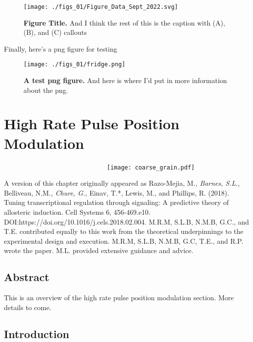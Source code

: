 \documentclass[12pt]{caltech_thesis}
\begin{document}
\hypertarget{fig:custom_figure}{%
\begin{figure}
\centering
\texttt{[image: ./figs\_01/Figure\_Data\_Sept\_2022.svg]}
\caption[{A jitterate data figure.}]{\textbf{Figure Title.} And I think
the rest of this is the caption with (A), (B), and (C) callouts}
\label{fig:custom_figure}
\end{figure}
}

Finally, here's a png figure for testing

\hypertarget{fig:test_png_figure}{%
\begin{figure}
\centering
\texttt{[image: ./figs\_01/fridge.png]}
\caption[{A png figure.}]{\textbf{A test png figure.} And here is where
I'd put in more information about the png.}
\label{fig:test_png_figure}
\end{figure}
}

\hypertarget{high-rate-pulse-position-modulation}{%
\chapter{High Rate Pulse Position
Modulation}\label{high-rate-pulse-position-modulation}}

~~~~~~~~~~~~~~~~~~~~~~~~~~~~~~\texttt{[image: coarse\_grain.pdf]}

A version of this chapter originally appeared as Razo-Mejia, M.\emph{,
Barnes, S.L.}, Belliveau, N.M.\emph{, Chure, G.}, Einav, T.*, Lewis, M.,
and Phillips, R. (2018). Tuning transcriptional regulation through
signaling: A predictive theory of allosteric induction. Cell Systems 6,
456-469.e10. DOI:https://doi.org/10.1016/j.cels.2018.02.004. M.R.M,
S.L.B, N.M.B, G.C., and T.E. contributed equally to this work from the
theoretical underpinnings to the experimental design and execution.
M.R.M, S.L.B, N.M.B, G.C, T.E., and R.P. wrote the paper. M.L. provided
extensive guidance and advice.

\hypertarget{abstract-1}{%
\section{Abstract}\label{abstract-1}}

This is an overview of the high rate pulse position modulation section.
More details to come.

\hypertarget{introduction-1}{%
\section{Introduction}\label{introduction-1}}
\end{document}
